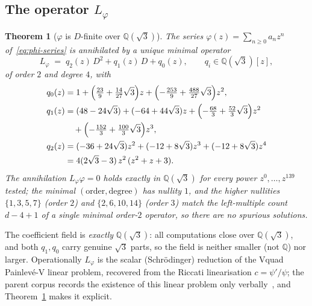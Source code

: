 \documentclass[11pt,reqno]{amsart}
\renewcommand{\_}{\vquadorigunderscore\allowbreak}
\theoremstyle{plain}
\newtheorem{theorem}{Theorem}[section]
\theoremstyle{definition}
\newcommand{\Lphi}{L_{\varphi}}
\newcommand{\Qsqrt}{\mathbb{Q}(\sqrt3)}
\begin{document}
\subsection{The operator \texorpdfstring{$\Lphi$}{Lphi}}
\begin{theorem}[$\varphi$ is $D$-finite over $\Qsqrt$]\label{thm:Lphi}
The series $\varphi(z)=\sum_{n\ge0}a_nz^n$ of~\eqref{eq:phi-series} is annihilated by a unique
minimal operator
\[
  \Lphi \;=\; q_2(z)\,D^2 + q_1(z)\,D + q_0(z),\qquad q_i\in\Qsqrt[z],
\]
of order $2$ and degree $4$, with
\begin{align*}
  q_0(z)&=1+\Bigl(\tfrac{23}{9}+\tfrac{14}{27}\sqrt3\Bigr)z
              +\Bigl(-\tfrac{253}{9}+\tfrac{488}{27}\sqrt3\Bigr)z^2,\\
  q_1(z)&=(48-24\sqrt3)+(-64+44\sqrt3)z+\Bigl(-\tfrac{68}{3}+\tfrac{52}{3}\sqrt3\Bigr)z^2\\
        &\quad+\Bigl(-\tfrac{152}{3}+\tfrac{100}{3}\sqrt3\Bigr)z^3,\\
  q_2(z)&=(-36+24\sqrt3)z^2+(-12+8\sqrt3)z^3+(-12+8\sqrt3)z^4\\
        &=4(2\sqrt3-3)\,z^2\,(z^2+z+3).
\end{align*}
The annihilation $\Lphi\varphi=0$ holds exactly in $\Qsqrt$ for every power $z^0,\dots,z^{139}$
tested; the minimal $(\text{order},\text{degree})$ has nullity $1$, and the higher nullities
$\{1,3,5,7\}$ (order $2$) and $\{2,6,10,14\}$ (order $3$) match the left-multiple count
$d-4+1$ of a single minimal order-$2$ operator, so there are no spurious solutions.
\end{theorem}

The coefficient field is \emph{exactly} $\Qsqrt$: all computations close over $\Qsqrt$, and both
$q_1,q_0$ carry genuine $\sqrt3$ parts, so the field is neither smaller (not $\mathbb{Q}$) nor
larger. Operationally $\Lphi$ is the scalar (Schr\"odinger) reduction of the V\_quad Painlev\'e-V
linear problem, recovered from the Riccati linearisation $c=\psi'/\psi$; the parent corpus
records the existence of this linear problem only verbally~\cite{Vquad}, and Theorem~\ref{thm:Lphi}
makes it explicit.
\end{document}

